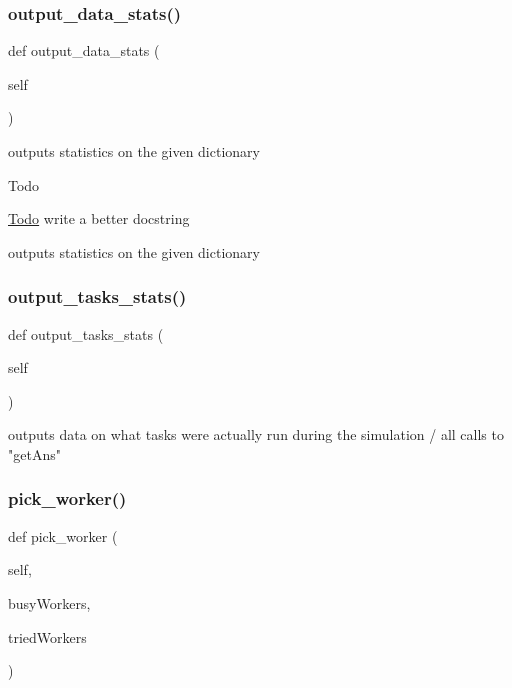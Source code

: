 \subsubsection{\texorpdfstring{output\_data\_stats()}{output\_data\_stats()}}
{\footnotesize\ttfamily def output\+\_\+data\+\_\+stats (\begin{DoxyParamCaption}\item[{}]{self }\end{DoxyParamCaption})}



outputs statistics on the given dictionary 

\begin{DoxyRefDesc}{Todo}
\item[\mbox{\hyperlink{todo__todo000005}{Todo}}]write a better docstring \end{DoxyRefDesc}
\begin{DoxyVerb}outputs statistics on the given dictionary
\end{DoxyVerb}
 \mbox{\label{classdynamicfilterapp_1_1test__simulations_1_1_simulation_test_aed5cf6d5470f93d7a538e4c2c7a8bb34}} 
\subsubsection{\texorpdfstring{output\_tasks\_stats()}{output\_tasks\_stats()}}
{\footnotesize\ttfamily def output\+\_\+tasks\+\_\+stats (\begin{DoxyParamCaption}\item[{}]{self }\end{DoxyParamCaption})}

\begin{DoxyVerb}outputs data on what tasks were actually run during the simulation / all calls to "getAns" \end{DoxyVerb}
 \mbox{\label{classdynamicfilterapp_1_1test__simulations_1_1_simulation_test_acb17139f8e2f7a4b835ec1c05400e8c2}} 
\subsubsection{\texorpdfstring{pick\_worker()}{pick\_worker()}}
{\footnotesize\ttfamily def pick\+\_\+worker (\begin{DoxyParamCaption}\item[{}]{self,  }\item[{}]{busy\+Workers,  }\item[{}]{tried\+Workers }\end{DoxyParamCaption})}



